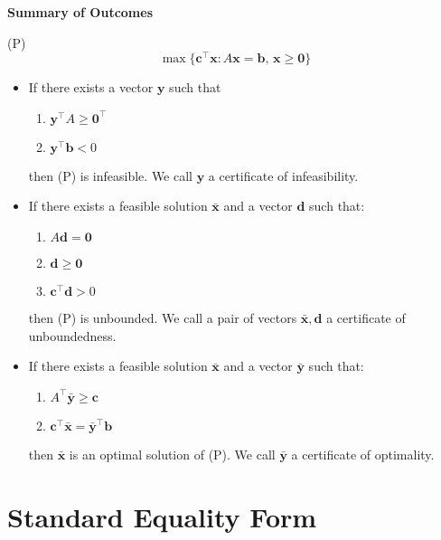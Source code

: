 \begin{thmbox}
    \textbf{Summary of Outcomes}

    (P)
    \[\max \{\bm{c}^\top \bm{x} : A\bm{x}=\bm{b},\,
        \bm{x}\geqslant \bm{0}\}\]
    \begin{itemize}
        \item If there exists a vector $ \bm{y} $ such that
              \begin{enumerate}[(1)]
                  \item $\bm{y}^\top A\geqslant \bm{0}^\top $
                  \item $\bm{y}^\top \bm{b}<0$
              \end{enumerate}
              then (P) is infeasible. We call $ \bm{y} $ a certificate of infeasibility.

        \item If there exists a feasible solution $\bar{\bm{x}}$ and a vector $ \bm{d} $ such that:
              \begin{enumerate}[(1)]
                  \item $A\bm{d}=\bm{0}$
                  \item $\bm{d}\geqslant  \bm{0}$
                  \item $\bm{c}^\top \bm{d}>0$
              \end{enumerate}
              then (P) is unbounded. We call a pair of vectors $ \bar{\bm{x}}, \bm{d} $
              a certificate of unboundedness.

        \item If there exists a feasible solution $ \bm{\bar{x}} $ and a vector $ \bm{\bar{y}} $ such that:
              \begin{enumerate}[(1)]
                  \item $A^\top \bm{\bar{y}}\geqslant \bm{c}$
                  \item $\bm{c}^\top \bm{\bar{x}}=\bm{\bar{y}}^\top \bm{b}$
              \end{enumerate}
              then $\bm{\bar{x}}$ is an optimal solution of (P). We call $ \bm{\bar{y}} $
              a certificate of optimality.
    \end{itemize}
\end{thmbox}

\section{Standard Equality Form}

